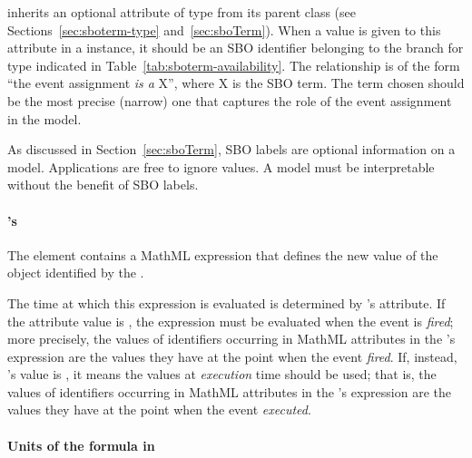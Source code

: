 \EventAssignment   inherits an optional 
attribute of type  from its parent
class \SBase (see Sections~\ref{sec:sboterm-type}
and~\ref{sec:sboTerm}).  When a value is given to this
attribute in a  \EventAssignment  instance, it should be an
SBO identifier belonging to the branch for type  \EventAssignment 
indicated in Table~\ref{tab:sboterm-availability}.  The relationship is
of the form ``the event assignment \emph{is a} X'', where X is
the SBO term.  The term chosen should be the most precise (narrow)
one that captures the role of the event assignment  in the model.

As discussed in Section~\ref{sec:sboTerm}, SBO labels are optional
information on a model.  Applications are free to ignore
 values.  A model must be interpretable without the
benefit of SBO labels.


\paragraph{'s }

The  element contains a MathML expression that defines
the new value of the object identified by the .

The time at which this expression is evaluated is determined by
\Event's  attribute.  If the
attribute value is , the expression must
be evaluated when the event is \emph{fired}; more precisely, the
values of identifiers occurring in MathML  attributes in
the \EventAssignment's  expression are the values they
have at the point when the event \emph{fired}.  If, instead,
's value is , it means
the values at \emph{execution} time should be used; that is, the
values of identifiers occurring in MathML  attributes in
the \EventAssignment's  expression are the values they
have at the point when the event \emph{executed}.


\paragraph{Units of the  formula in }

